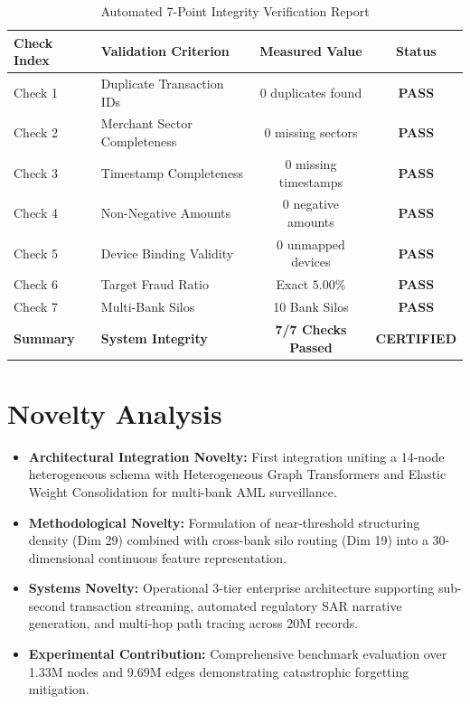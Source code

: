 \documentclass[conference]{IEEEtran}
\begin{document}
\begin{table}[htbp]
\caption{Automated 7-Point Integrity Verification Report}
\label{tab:validation}
\centering
\begin{tabular}{@{}llcc@{}}
\toprule
\textbf{Check Index} & \textbf{Validation Criterion} & \textbf{Measured Value} & \textbf{Status} \\
\midrule
Check 1 & Duplicate Transaction IDs & $0$ duplicates found & \textbf{PASS} \\
Check 2 & Merchant Sector Completeness & $0$ missing sectors & \textbf{PASS} \\
Check 3 & Timestamp Completeness & $0$ missing timestamps & \textbf{PASS} \\
Check 4 & Non-Negative Amounts & $0$ negative amounts & \textbf{PASS} \\
Check 5 & Device Binding Validity & $0$ unmapped devices & \textbf{PASS} \\
Check 6 & Target Fraud Ratio & Exact $5.00\%$ & \textbf{PASS} \\
Check 7 & Multi-Bank Silos & 10 Bank Silos & \textbf{PASS} \\
\midrule
\textbf{Summary} & \textbf{System Integrity} & \textbf{7/7 Checks Passed} & \textbf{CERTIFIED} \\
\bottomrule
\end{tabular}
\end{table}

\section{Novelty Analysis}
\begin{itemize}
    \item \textbf{Architectural Integration Novelty:} First integration uniting a 14-node heterogeneous schema with Heterogeneous Graph Transformers and Elastic Weight Consolidation for multi-bank AML surveillance.
    \item \textbf{Methodological Novelty:} Formulation of near-threshold structuring density (Dim 29) combined with cross-bank silo routing (Dim 19) into a 30-dimensional continuous feature representation.
    \item \textbf{Systems Novelty:} Operational 3-tier enterprise architecture supporting sub-second transaction streaming, automated regulatory SAR narrative generation, and multi-hop path tracing across 20M records.
    \item \textbf{Experimental Contribution:} Comprehensive benchmark evaluation over 1.33M nodes and 9.69M edges demonstrating catastrophic forgetting mitigation.
\end{itemize}
\end{document}
